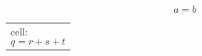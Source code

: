 \documentclass{article}
\begin{document}
\begin{equation}a=b\end{equation}
\begin{tabular}{p{4cm}}cell: \begin{equation}q=r+s+t\end{equation}\end{tabular}
\end{document}

